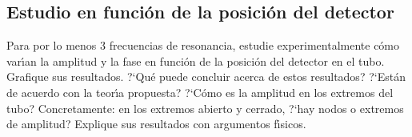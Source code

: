 \documentclass[laboratorio]{guia}
\begin{document}
\subsection{Estudio en funci\'on de la posici\'on del detector}

Para por lo menos 3 frecuencias de resonancia, estudie experimentalmente c\'omo
var\'\i an la amplitud y la fase en funci\'on de la posici\'on del detector en
el tubo. Grafique sus resultados. ?`Qu\'e puede concluir acerca de estos
resultados? ?`Est\'an de acuerdo con la teor\'\i a propuesta? ?`C\'omo es la
amplitud en los extremos del tubo? Concretamente: en los extremos abierto y
cerrado, ?`hay nodos o extremos de amplitud? Explique sus resultados con
argumentos f\'\i sicos.

\nocite{Alonso1998,Crawford1994}
 

\end{document}

